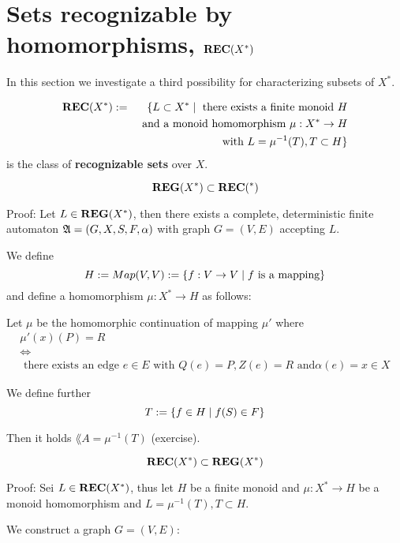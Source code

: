\section{Sets recognizable by homomorphisms, $\mbox{{\bf REC}}(X^*)$}

In this section we investigate a third possibility for characterizing subsets of
$X^*$.

\begin{definition}
\begin{eqnarray*}
 \mbox{{\bf REC}}(X^*) & := & \{ L \subset X^* \mid \mbox{ there exists a
finite monoid } H \\
& & \mbox{ and a monoid homomorphism }\mu : X^* \to H \\
& & \mbox{ with } L = \mu^{-1}(T), T \subset H \}
\end{eqnarray*}
is the class of {\bf recognizable sets} over $X$.
\end{definition}

\begin{lemma}
\[ \mbox{{\bf REG}}(X^*) \subset \mbox{{\bf REC}}(^*) \]
\end{lemma}

Proof: Let $L \in \mbox{{\bf REG}}(X^*)$, then there exists a complete, deterministic finite
automaton $\mbox{$\mathfrak{A}$} = (G, X, S, F, \alpha)$ with graph $G = (V, E)$ accepting $L$.

We define 
\[ H := Map(V,V) := \mbox{$\{f : V \to V \mid f \mbox{ is a mapping}\}$} \]
and define a homomorphism $\mu : X^* \to H$ as follows:

Let $\mu$ be the homomorphic continuation of mapping $\mu'$ where
\begin{eqnarray*}
& \mu'(x)(P) = R & \\
& \Leftrightarrow & \\
& \mbox{ there exists an edge }e \in E\mbox{ with }Q(e) = P, Z(e) = R\mbox{ and
}\alpha(e) = x \in X &
\end{eqnarray*}

We define further \[ T := \mbox{$\{f \in H \mid f(S) \in F\}$} \]

Then it holds $\lang{A} = \mu^{-1}(T)$ (exercise).

\begin{lemma}
\[ \mbox{{\bf REC}}(X^*) \subset \mbox{{\bf REG}}(X^*) \]
\end{lemma}

Proof: Sei $L \in \mbox{{\bf REC}}(X^*)$, thus let $H$ be a finite monoid and $\mu : X^* \to
H$ be a monoid homomorphism and $L = \mu^{-1}(T), T \subset H$.

We construct a graph $G = (V, E)$:

